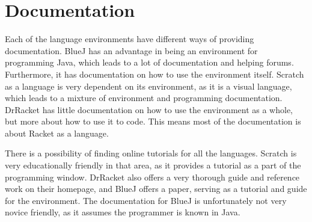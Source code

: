 \section{Documentation}
\label{sec:documentation}
Each of the language environments have different ways of providing documentation. BlueJ has an advantage in being an environment for programming Java, which leads to a lot of documentation and helping forums. Furthermore, it has documentation on how to use the environment itself. Scratch as a language is very dependent on its environment, as it is a visual language, which leads to a mixture of environment and programming documentation. DrRacket has little documentation on how to use the environment as a whole, but more about how to use it to code. This means most of the documentation is about Racket as a language.

There is a possibility of finding online tutorials for all the languages. Scratch is very educationally friendly in that area, as it provides a tutorial as a part of the programming window. DrRacket also offers a very thorough guide and reference work on their homepage, and BlueJ offers a paper, serving as a tutorial and guide for the environment. The documentation for BlueJ is unfortunately not very novice friendly, as it assumes the programmer is known in Java.